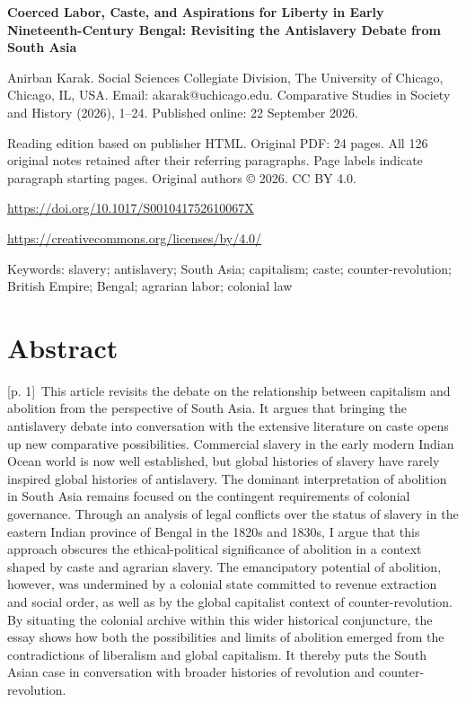 \documentclass[10pt,a4paper]{article}
\begin{document}
{\Large\bfseries Coerced Labor, Caste, and Aspirations for Liberty in Early Nineteenth-Century Bengal: Revisiting the Antislavery Debate from South Asia\par}\medskip

Anirban Karak. Social Sciences Collegiate Division, The University of Chicago, Chicago, IL, USA. Email: akarak@uchicago.edu. Comparative Studies in Society and History (2026), 1–24. Published online: 22 September 2026.\par
Reading edition based on publisher HTML. Original PDF: 24 pages. All 126 original notes retained after their referring paragraphs. Page labels indicate paragraph starting pages. Original authors © 2026. CC BY 4.0.\par
\url{https://doi.org/10.1017/S001041752610067X}\par
\url{https://creativecommons.org/licenses/by/4.0/}\par
Keywords: slavery; antislavery; South Asia; capitalism; caste; counter-revolution; British Empire; Bengal; agrarian labor; colonial law\par\bigskip
{}\section*{Abstract}
{\scriptsize\color{gray} [p. 1]}\ This article revisits the debate on the relationship between capitalism and abolition from the perspective of South Asia. It argues that bringing the antislavery debate into conversation with the extensive literature on caste opens up new comparative possibilities. Commercial slavery in the early modern Indian Ocean world is now well established, but global histories of slavery have rarely inspired global histories of antislavery. The dominant interpretation of abolition in South Asia remains focused on the contingent requirements of colonial governance. Through an analysis of legal conflicts over the status of slavery in the eastern Indian province of Bengal in the 1820s and 1830s, I argue that this approach obscures the ethical-political significance of abolition in a context shaped by caste and agrarian slavery. The emancipatory potential of abolition, however, was undermined by a colonial state committed to revenue extraction and social order, as well as by the global capitalist context of counter-revolution. By situating the colonial archive within this wider historical conjuncture, the essay shows how both the possibilities and limits of abolition emerged from the contradictions of liberalism and global capitalism. It thereby puts the South Asian case in conversation with broader histories of revolution and counter-revolution.\par
\end{document}
